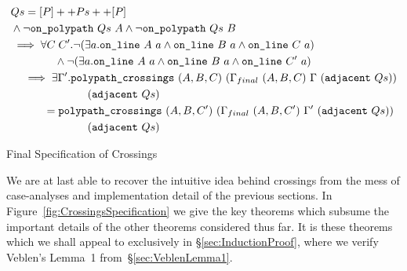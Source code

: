 \begin{boxedfigure}
\begin{multline}\label{eq:changeTriangle}
  \begin{aligned}
    &Qs = [P] ++ Ps ++ [P]\\
    &\wedge \neg\texttt{on\_polypath}\ Qs\ A \wedge \neg\texttt{on\_polypath}\ Qs\ B\\
    &\implies \forall C\;C'. \neg(\exists a.\texttt{on\_line}\ A\ a\wedge \texttt{on\_line}\ B\ a\wedge \texttt{on\_line}\ C\ a)\\
    &\qquad\qquad\wedge \neg(\exists a.\texttt{on\_line}\ A\ a\wedge \texttt{on\_line}\ B\ a\wedge \texttt{on\_line}\ C'\ a)\\
    &\quad\implies \exists \Gamma'. \texttt{polypath\_crossings}\ (A,B,C)\ (\Gamma_{final}\ (A,B,C)\ \Gamma\ (\texttt{adjacent}\ Qs))\\
    &\quad\qquad\qquad\qquad(\texttt{adjacent}\ Qs)\\
    &\quad\qquad = \texttt{polypath\_crossings}\ (A,B,C')\ (\Gamma_{final}\ (A,B,C')\ \Gamma'\ (\texttt{adjacent}\ Qs))\\
    &\quad\qquad\qquad\qquad(\texttt{adjacent}\ Qs)\\
  \end{aligned}
\end{multline}
\caption{Final Specification of Crossings}\label{fig:CrossingsSpecification}
\end{boxedfigure}

We are at last able to recover the intuitive idea behind crossings from the mess of case-analyses and implementation detail of the previous sections. In Figure~\ref{fig:CrossingsSpecification} we give the key theorems which subsume the important details of the other theorems considered thus far. It is these theorems which we shall appeal to exclusively in \S\ref{sec:InductionProof}, where we verify Veblen's Lemma~1 from~\S\ref{sec:VeblenLemma1}.

